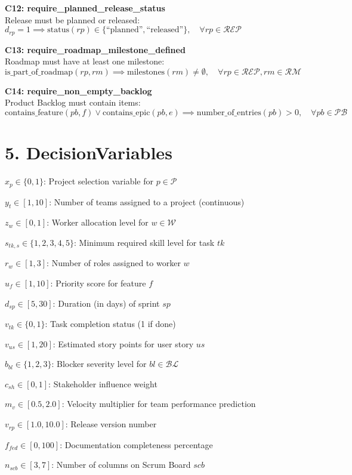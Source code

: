 \documentclass[12pt]{article}
\begin{document}
    \item \textbf{C12: require\_planned\_release\_status} \\
    Release must be planned or released: \\
    $ d_{rp} = 1 \implies \text{status}(rp) \in \{\text{``planned''}, \text{``released''}\}, \quad \forall rp \in \mathcal{REP} $

    \item \textbf{C13: require\_roadmap\_milestone\_defined} \\
    Roadmap must have at least one milestone: \\
    $ \text{is\_part\_of\_roadmap}(rp, rm) \implies \text{milestones}(rm) \neq \emptyset, \quad \forall rp \in \mathcal{REP}, rm \in \mathcal{RM} $

    \item \textbf{C14: require\_non\_empty\_backlog} \\
    Product Backlog must contain items: \\
    $ \text{contains\_feature}(pb,f) \lor \text{contains\_epic}(pb,e) \implies \text{number\_of\_entries}(pb) > 0, \quad \forall pb \in \mathcal{PB} $

\section{5. DecisionVariables}
\item $ x_p \in \{0,1\} $: Project selection variable for $ p \in \mathcal{P} $
    \item $ y_t \in [1,10] $: Number of teams assigned to a project (continuous)
    \item $ z_w \in [0,1] $: Worker allocation level for $ w \in \mathcal{W} $
    \item $ s_{tk,s} \in \{1,2,3,4,5\} $: Minimum required skill level for task $ tk $
    \item $ r_w \in [1,3] $: Number of roles assigned to worker $ w $
    \item $ u_f \in [1,10] $: Priority score for feature $ f $
    \item $ d_{sp} \in [5,30] $: Duration (in days) of sprint $ sp $
    \item $ v_{tk} \in \{0,1\} $: Task completion status (1 if done)
    \item $ v_{us} \in [1,20] $: Estimated story points for user story $ us $
    \item $ b_{bl} \in \{1,2,3\} $: Blocker severity level for $ bl \in \mathcal{BL} $
    \item $ c_{sh} \in [0,1] $: Stakeholder influence weight
    \item $ m_v \in [0.5, 2.0] $: Velocity multiplier for team performance prediction
    \item $ v_{rp} \in [1.0, 10.0] $: Release version number
    \item $ f_{fed} \in [0, 100] $: Documentation completeness percentage
    \item $ n_{scb} \in [3,7] $: Number of columns on Scrum Board $ scb $
\end{document}
